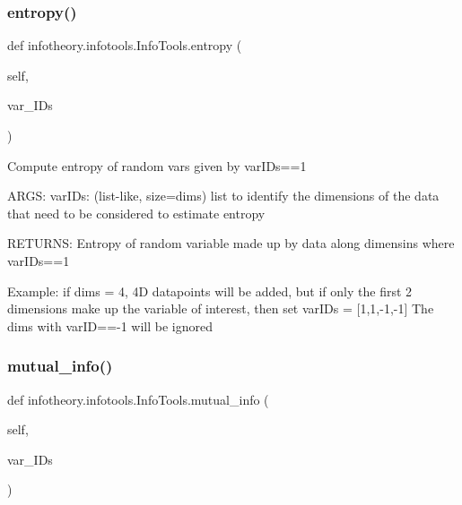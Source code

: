 \subsubsection{\texorpdfstring{entropy()}{entropy()}}
{\footnotesize\ttfamily def infotheory.\+infotools.\+Info\+Tools.\+entropy (\begin{DoxyParamCaption}\item[{}]{self,  }\item[{}]{var\+\_\+\+I\+Ds }\end{DoxyParamCaption})}

\begin{DoxyVerb}Compute entropy of random vars given by varIDs==1

ARGS:
varIDs: (list-like, size=dims) list to identify the dimensions of the data that need to be considered to estimate entropy

RETURNS:
Entropy of random variable made up by data along dimensins where varIDs==1

Example:
if dims = 4, 4D datapoints will be added, but if only the first 2 dimensions make up the variable of interest, then set
varIDs = [1,1,-1,-1]
The dims with varID==-1 will be ignored
\end{DoxyVerb}
 \mbox{\label{classinfotheory_1_1infotools_1_1_info_tools_a77f444a7cba9457f8bf30c9e2d02ea86}} 
\subsubsection{\texorpdfstring{mutual\+\_\+info()}{mutual\_info()}}
{\footnotesize\ttfamily def infotheory.\+infotools.\+Info\+Tools.\+mutual\+\_\+info (\begin{DoxyParamCaption}\item[{}]{self,  }\item[{}]{var\+\_\+\+I\+Ds }\end{DoxyParamCaption})}

